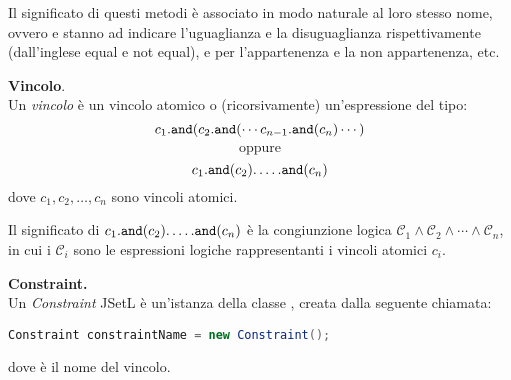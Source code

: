 Il significato di questi metodi è associato in modo naturale al loro stesso 
nome, ovvero  e  stanno ad indicare l'uguaglianza e la
disuguaglianza rispettivamente (dall'inglese equal e not equal),
 e  per l'appartenenza e la non appartenenza, etc.

\begin{flushleft}\textbf{Vincolo}.\\
Un \emph{vincolo} è un vincolo atomico o (ricorsivamente) un'espressione
del tipo:
\[
c_1.\texttt{and}(c_2.\texttt{and}(\cdots c_{n-1}.\texttt{and}(c_n) \cdots)
\]
\[
\textrm{oppure}
\]
\[
c_1.\texttt{and}(c_2). \ldots .\texttt{and}(c_n)
\]
dove $c_1, c_2, \ldots, c_n$ sono vincoli atomici.
\end{flushleft} 
Il significato di $c_1.\texttt{and}(c_2). \ldots .\texttt{and}(c_n)$ è la 
congiunzione logica $\mathcal{C}_1 \wedge \mathcal{C}_2 \wedge \cdots 
\wedge \mathcal{C}_n$, in cui i $\mathcal{C}_i$ sono le espressioni logiche
rappresentanti i vincoli atomici $c_i$.

\begin{flushleft}\textbf{Constraint.}\\
Un \emph{Constraint} JSetL è un'istanza della classe , creata
dalla seguente chiamata:
\begin{center}
\lstinline[language = Java]
$Constraint constraintName = new Constraint();$
\end{center}
dove  è il nome del vincolo.
\end{flushleft}


